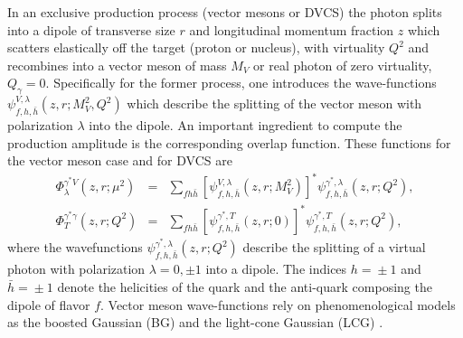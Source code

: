 \documentclass[twocolumn,showpacs,preprintnumbers,amsmath,amssymb,showkeys,aps,prd,a4paper,byrevtex]{revtex4}
\begin{document}
In an exclusive production process (vector mesons or DVCS) the photon splits into a dipole of transverse size $r$ and longitudinal momentum fraction $z$ which scatters elastically off the target (proton or nucleus), with virtuality $Q^2$ and recombines into a vector meson of mass $M_V$ or real photon of zero virtuality, $Q_{\gamma}=0$. Specifically for the former process, one introduces the wave-functions $\psi^{V,\lambda}_{f,h,\bar{h}}(z,r;M_V^2,Q^2)$ which describe the splitting of the vector meson with polarization $\lambda$ into the
dipole. An important ingredient to compute the production amplitude is the corresponding overlap function. These functions for the vector meson case and for DVCS are
\begin{eqnarray}
\label{overvm}
\Phi_{\lambda}^{\gamma^*V}(z,r;\mu^2)\!\!
 & = &\!\! \!\!\sum_{fh\bar{h}} \left[
   \psi^{V,\lambda}_{f,h,\bar{h}}(z,r;M_V^2)\right]^*
\psi^{\gamma^*,\lambda}_{f,h,\bar{h}}(z,r;Q^2),\\
\Phi^{\gamma^*\gamma}_T(z,r;Q^2) \!\!& = & \!\!\!\!\sum_{fh\bar{h}}
\left[\psi^{\gamma^*,T}_{f,h,\bar{h}}(z,r;0)\right]^*
\psi^{\gamma^*,T}_{f,h,\bar{h}}(z,r;Q^2),\label{overdv}
\end{eqnarray}
where the wavefunctions $\psi^{\gamma^*,\lambda}_{f,h,\bar{h}}(z,r;Q^2)$ describe the splitting of a virtual photon with polarization $\lambda\!=\!0,\pm 1$
into a dipole. The indices $h\!=\!\pm1$ and
$\bar{h}\!=\!\pm1$ denote the helicities of the quark and the
anti-quark composing the dipole of flavor $f$. Vector meson wave-functions rely on phenomenological models as the boosted Gaussian  (BG) \cite{mwfs1} and the light-cone Gaussian
(LCG) \cite{mwfs3}.
\end{document}
